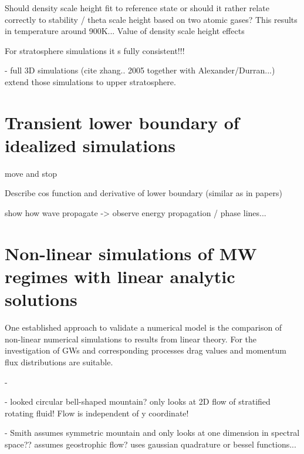 Should density scale height fit to reference state or should it rather relate correctly to stability / theta scale height based on two atomic gases? This results in temperature around 900K...
Value of density scale height effects

For stratosphere simulations it s fully consistent!!! 

- full 3D simulations (cite zhang.. 2005 together with Alexander/Durran...) extend those simulations to upper stratosphere.


\section{Transient lower boundary of idealized simulations}

move and stop 


Describe cos function and derivative of lower boundary (similar as in papers)




show how wave propagate -> observe energy propagation / phase lines...


\section{Non-linear simulations of MW regimes with linear analytic solutions}
\label{sec:linear-MWs}



One established approach to validate a numerical model is the comparison of non-linear numerical simulations to results from linear theory. For the investigation of GWs and corresponding processes drag values and momentum flux distributions are suitable.


- \textcite{bretherton_momentum_1969}

- \textcite{smith_influence_1979} looked circular bell-shaped mountain? only looks at 2D flow of stratified rotating fluid! Flow is independent of y coordinate! 

- Smith assumes symmetric mountain and only looks at one dimension in spectral space?? assumes geostrophic flow? uses gaussian quadrature or bessel functions...

